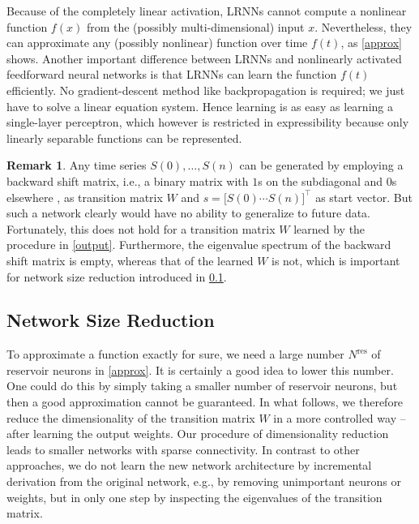 \documentclass[twoside,11pt]{article}
\theoremstyle{definition}
\newtheorem{remk}{Remark}
\begin{document}
Because of the completely linear activation, LRNNs cannot compute a nonlinear
function $f(x)$ from the (possibly multi-dimensional) input $x$. Nevertheless,
they can approximate any (possibly nonlinear) function over time $f(t)$, as
\cref{approx} shows. Another important difference between LRNNs and
nonlinearly activated feedforward neural networks is that LRNNs can learn
the function $f(t)$ efficiently. No gradient-descent method like backpropagation is
required; we just have to solve a linear equation system. Hence learning is as
easy as learning a single-layer perceptron, which however is restricted in
expressibility because only linearly separable functions can be represented.

\begin{remk}
Any time series $S(0),\dots,S(n)$ can be generated by employing a backward shift
matrix, i.e., a binary matrix with $1$s on the subdiagonal and $0$s elsewhere
\citep[Sect.~0.9.7]{HJ13}, as transition matrix $W$ and $s = \big[ S(0) \cdots
S(n) \big]^\top$ as start vector. But such a network clearly would have no
ability to generalize to future data. Fortunately, this does not hold for a
transition matrix $W$ learned by the procedure in \cref{output}. Furthermore,
the eigenvalue spectrum of the backward shift matrix is empty, whereas that of
the learned $W$ is not, which is important for network size reduction
introduced in \cref{reduce}.
\end{remk}

\subsection{Network Size Reduction}\label{reduce}

To approximate a function exactly for sure, we need a large number
$N^\mathrm{res}$ of reservoir neurons in \cref{approx}. It is certainly a
good idea to lower this number. One could do this by simply taking a smaller
number of reservoir neurons, but then a good approximation cannot be guaranteed.
In what follows, we therefore reduce the dimensionality of the transition matrix $W$ in a
more controlled way -- after learning the output weights. Our procedure of
dimensionality reduction leads to smaller networks with sparse connectivity. In
contrast to other approaches, we do not learn the new network architecture by
incremental derivation from the original network, e.g., by removing unimportant
neurons or weights, but in only one step by inspecting the eigenvalues of the
transition matrix.
\end{document}
